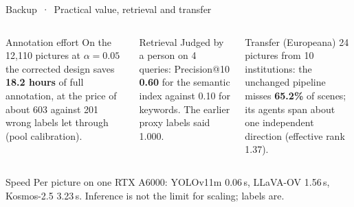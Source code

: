 \documentclass[aspectratio=169,10pt]{beamer}
\begin{document}
\begin{frame}{Backup \,·\, Practical value, retrieval and transfer}
\begin{columns}[T,onlytextwidth]
\begin{defbox}{Annotation effort}
On the 12,110 pictures at $\alpha = 0.05$ the corrected design saves \textbf{18.2 hours} of full annotation, at the price of about 603 against 201 wrong labels let through (pool calibration).
\end{defbox}
\begin{defbox}{Retrieval}
Judged by a person on 4 queries: Precision@10 \textbf{0.60} for the semantic index against 0.10 for keywords. The earlier proxy labels said 1.000.
\end{defbox}
\begin{defbox}{Transfer (Europeana)}
24 pictures from 10 institutions: the unchanged pipeline misses \textbf{65.2\%} of scenes; its agents span about one independent direction (effective rank 1.37).
\end{defbox}
\end{columns}
\vspace{6pt}
\begin{defbox}{Speed}
Per picture on one RTX A6000: YOLOv11m 0.06\,s, LLaVA-OV 1.56\,s, Kosmos-2.5 3.23\,s. Inference is not the limit for scaling; labels are.
\end{defbox}
\end{frame}
\end{document}
